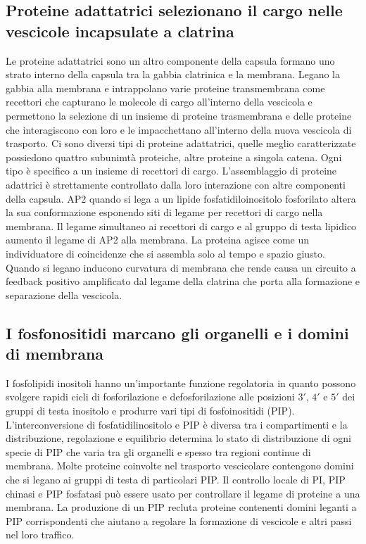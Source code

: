 \subsection{Proteine adattatrici selezionano il cargo nelle vescicole incapsulate a clatrina}
Le proteine adattatrici sono un altro componente della capsula formano uno strato interno della capsula tra la gabbia clatrinica e la membrana. Legano la gabbia alla membrana e 
intrappolano varie proteine transmembrana come recettori che capturano le molecole di cargo all'interno della vescicola e permettono la selezione di un insieme di proteine trasmembrana
e delle proteine che interagiscono con loro e le impacchettano all'interno della nuova vescicola di trasporto. Ci sono diversi tipi di proteine adattatrici, quelle meglio caratterizzate
possiedono quattro subunimt\`a proteiche, altre proteine a singola catena. Ogni tipo \`e specifico a un insieme di recettori di cargo. L'assemblaggio di proteine adattrici \`e 
strettamente controllato dalla loro interazione con altre componenti della capsula. AP2 quando si lega a un lipide fosfatidiloinositolo fosforilato altera la sua conformazione esponendo 
siti di legame per recettori di cargo nella membrana. Il legame simultaneo ai recettori di cargo e al gruppo di testa lipidico aumento il legame di AP2 alla membrana. La proteina
agisce come un individuatore di coincidenze che si assembla solo al tempo e spazio giusto. Quando si legano inducono curvatura di membrana che rende causa un circuito a feedback 
positivo amplificato dal legame della clatrina che porta alla formazione e separazione della vescicola. 
\subsection{I fosfonositidi marcano gli organelli e i domini di membrana}
I fosfolipidi inositoli hanno un'importante funzione regolatoria in quanto possono svolgere rapidi cicli di fosforilazione e defosforilazione alle posizioni $3'$, $4'$ e $5'$ dei gruppi
di testa inositolo e produrre vari tipi di fosfoinositidi (PIP). L'interconversione di fosfatidilinositolo e PIP \`e diversa tra i compartimenti e la distribuzione, regolazione e 
equilibrio  determina lo stato di distribuzione di ogni specie di PIP che varia tra gli organelli e spesso tra regioni continue di membrana. Molte proteine coinvolte nel trasporto 
vescicolare contengono domini che si legano  ai gruppi di testa di particolari PIP. Il controllo locale di PI, PIP chinasi e PIP fosfatasi pu\`o essere usato per controllare il legame 
di proteine a una membrana. La produzione di un PIP recluta proteine contenenti domini leganti a PIP corrispondenti che aiutano a regolare la formazione di vescicole e altri passi nel
loro traffico. 
